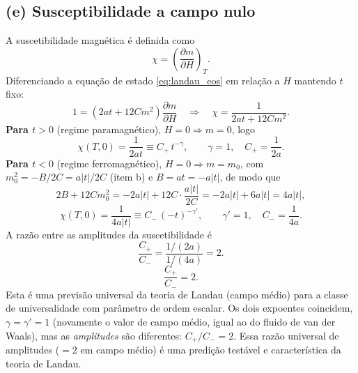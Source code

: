 \documentclass[11pt,a4paper]{article}
\begin{document}
\subsection*{(e) Susceptibilidade a campo nulo}
%
A suscetibilidade magnética é definida como
%
\begin{equation}
    \chi = \left( \frac{\partial m}{\partial H} \right)_T.
\end{equation}
%
Diferenciando a equação de estado \eqref{eq:landau_eos} em relação a $H$ mantendo $t$ fixo:
%
\begin{equation}
    1 = (2a t + 12 C m^2) \frac{\partial m}{\partial H} \quad \Longrightarrow \quad \chi = \frac{1}{2a t + 12 C m^2}.
\end{equation}
%
\textbf{Para $t>0$} (regime paramagnético), $H=0\Rightarrow m=0$, logo
%
\begin{equation}
    \boxed{
    \chi(T,0)=\frac{1}{2at}\equiv C_+\,t^{-\gamma},
    \qquad
    \gamma=1,\quad C_+=\frac{1}{2a}.
    }
\end{equation}
%
\textbf{Para $t<0$} (regime ferromagnético), $H=0\Rightarrow m=m_0$, com $m_0^2=-B/2C=a|t|/2C$ (item b) e $B=at=-a|t|$, de modo que
%
\begin{equation}
    2B+12Cm_0^2=-2a|t|+12C\cdot\frac{a|t|}{2C}=-2a|t|+6a|t|=4a|t|,
\end{equation}
%
\begin{equation}
    \boxed{
    \chi(T,0)=\frac{1}{4a|t|}\equiv C_-\,(-t)^{-\gamma'},
    \qquad
    \gamma'=1,\quad C_-=\frac{1}{4a}.
    }
\end{equation}
%
A razão entre as amplitudes da suscetibilidade é
%
\begin{equation}
    \frac{C_+}{C_-} = \frac{1/(2a)}{1/(4a)} = 2.
\end{equation}
%
\begin{equation}
    \boxed{\frac{C_+}{C_-} = 2}.
\end{equation}
%
Esta é uma previsão universal da teoria de Landau (campo médio) para a classe de universalidade com parâmetro de ordem escalar.
%
Os dois expoentes coincidem, $\gamma=\gamma'=1$ (novamente o valor de campo médio, igual ao do fluido de van der Waals), mas as \emph{amplitudes} são diferentes: $C_+/C_-=2$. Essa razão universal de amplitudes ($=2$ em campo médio) é uma predição testável e característica da teoria de Landau.
%
\end{document}
